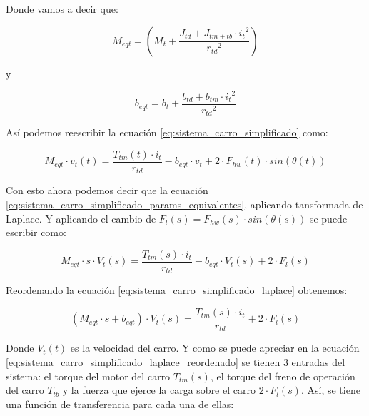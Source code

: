 \documentclass[11pt]{article}
\begin{document}
Donde vamos a decir que:

\begin{equation}
	\label{eq:sistema_carro_masa_equivalente}
	M_{eqt} = \left ( M_{t}+ \frac{J_{td}+J_{tm+tb}\cdot{i_{t}}^{2}}{{r_{td}}^{2}} \right )
\end{equation}

y

\begin{equation}
	\label{eq:sistema_carro_friccion_equivalente}
	b_{eqt} = b_{t} +\frac{b_{td}+b_{tm}\cdot{i_{t}}^{2}}{{r_{td}}^{2}}
\end{equation}

Así podemos reescribir la ecuación \ref{eq:sistema_carro_simplificado} como:

\begin{equation}
	\label{eq:sistema_carro_simplificado_params_equivalentes}
	M_{eqt}\cdot\dot{v}_{t}(t)=\frac{T_{tm}(t)\cdot i_{t}}{r_{td}}-b_{eqt}\cdot v_{t} + 2\cdot F_{hw}(t) \cdot sin \left ( \theta(t) \right )
\end{equation}

Con esto ahora podemos decir que la ecuación \ref{eq:sistema_carro_simplificado_params_equivalentes}, aplicando tansformada de Laplace. Y aplicando el cambio de $F_{l}(s)=F_{hw}(s) \cdot sin \left ( \theta(s) \right )$ se puede escribir como:

\begin{equation}
	\label{eq:sistema_carro_simplificado_laplace}
	M_{eqt}\cdot s\cdot V_{t}(s) = \frac{T_{tm}(s)\cdot i_{t}}{r_{td}}-b_{eqt}\cdot V_{t}(s) + 2\cdot F_{l}(s)
\end{equation}

Reordenando la ecuación \ref{eq:sistema_carro_simplificado_laplace} obtenemos:

\begin{equation}
	\label{eq:sistema_carro_simplificado_laplace_reordenado}
	\left ( M_{eqt}\cdot s+b_{eqt} \right )\cdot V_{t}(s) = \frac{T_{tm}(s)\cdot i_{t}}{r_{td}}+ 2\cdot F_{l}(s)
\end{equation}

Donde $V_{t}(t)$ es la velocidad del carro. Y como se puede apreciar en la ecuación \ref{eq:sistema_carro_simplificado_laplace_reordenado} se tienen 3 entradas del sistema: el torque del motor del carro $T_{tm}(s)$, el torque del freno de operación del carro $T_{tb}$ y la fuerza que ejerce la carga sobre el carro $2\cdot F_{l}(s)$. Así, se tiene una función de transferencia para cada una de ellas:
\end{document}
